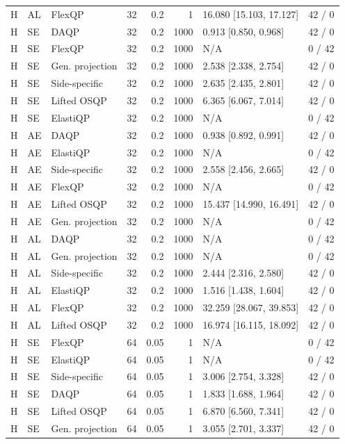 \begin{longtable}{@{}lllrrrlr@{}}
H & AL & FlexQP & 32 & 0.2 & 1 & 16.080 [15.103, 17.127] & 42 / 0 \\
H & SE & DAQP & 32 & 0.2 & 1000 & 0.913 [0.850, 0.968] & 42 / 0 \\
H & SE & FlexQP & 32 & 0.2 & 1000 & N/A & 0 / 42 \\
H & SE & Gen. projection & 32 & 0.2 & 1000 & 2.538 [2.338, 2.754] & 42 / 0 \\
H & SE & Side-specific & 32 & 0.2 & 1000 & 2.635 [2.435, 2.801] & 42 / 0 \\
H & SE & Lifted OSQP & 32 & 0.2 & 1000 & 6.365 [6.067, 7.014] & 42 / 0 \\
H & SE & ElastiQP & 32 & 0.2 & 1000 & N/A & 0 / 42 \\
H & AE & DAQP & 32 & 0.2 & 1000 & 0.938 [0.892, 0.991] & 42 / 0 \\
H & AE & ElastiQP & 32 & 0.2 & 1000 & N/A & 0 / 42 \\
H & AE & Side-specific & 32 & 0.2 & 1000 & 2.558 [2.456, 2.665] & 42 / 0 \\
H & AE & FlexQP & 32 & 0.2 & 1000 & N/A & 0 / 42 \\
H & AE & Lifted OSQP & 32 & 0.2 & 1000 & 15.437 [14.990, 16.491] & 42 / 0 \\
H & AE & Gen. projection & 32 & 0.2 & 1000 & N/A & 0 / 42 \\
H & AL & DAQP & 32 & 0.2 & 1000 & N/A & 0 / 42 \\
H & AL & Gen. projection & 32 & 0.2 & 1000 & N/A & 0 / 42 \\
H & AL & Side-specific & 32 & 0.2 & 1000 & 2.444 [2.316, 2.580] & 42 / 0 \\
H & AL & ElastiQP & 32 & 0.2 & 1000 & 1.516 [1.438, 1.604] & 42 / 0 \\
H & AL & FlexQP & 32 & 0.2 & 1000 & 32.259 [28.067, 39.853] & 42 / 0 \\
H & AL & Lifted OSQP & 32 & 0.2 & 1000 & 16.974 [16.115, 18.092] & 42 / 0 \\
H & SE & FlexQP & 64 & 0.05 & 1 & N/A & 0 / 42 \\
H & SE & ElastiQP & 64 & 0.05 & 1 & N/A & 0 / 42 \\
H & SE & Side-specific & 64 & 0.05 & 1 & 3.006 [2.754, 3.328] & 42 / 0 \\
H & SE & DAQP & 64 & 0.05 & 1 & 1.833 [1.688, 1.964] & 42 / 0 \\
H & SE & Lifted OSQP & 64 & 0.05 & 1 & 6.870 [6.560, 7.341] & 42 / 0 \\
H & SE & Gen. projection & 64 & 0.05 & 1 & 3.055 [2.701, 3.337] & 42 / 0 \\

\end{longtable}
